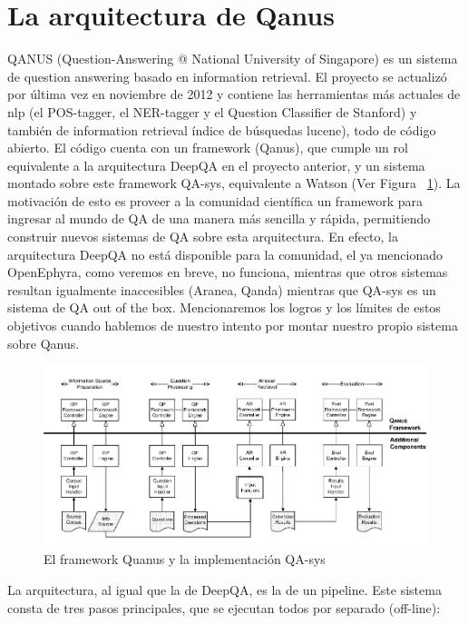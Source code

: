\bigskip

\section{La arquitectura de Qanus}

QANUS (Question-Answering @ National University of Singapore) es un
sistema de question answering basado en information retrieval. El
proyecto se actualizó por última vez en noviembre de 2012 y
contiene las herramientas más actuales de nlp (el POS-tagger, el
NER-tagger y el Question Classifier de Stanford) y también de
information retrieval índice de búsquedas lucene), todo de código
abierto. El código cuenta con un framework (Qanus), que cumple un rol
equivalente a la arquitectura DeepQA en el proyecto anterior, y un
sistema montado sobre este framework QA-sys, equivalente a Watson (Ver Figura ~\ref{fig:Quanus}). La
motivación de esto es proveer a la comunidad científica un
framework para ingresar al mundo de QA de una manera más sencilla y
rápida, permitiendo construir nuevos sistemas de QA sobre esta
arquitectura. En efecto, la arquitectura DeepQA no está disponible
para la comunidad, el ya mencionado OpenEphyra, como veremos en breve,
no funciona, mientras que otros sistemas resultan igualmente
inaccesibles (Aranea, Qanda) mientras que QA-sys es un sistema de QA
out of the box. Mencionaremos los logros y los límites de estos
objetivos cuando hablemos de nuestro intento por montar nuestro propio
sistema sobre Qanus. 

\begin{figure}
  \centering
    \includegraphics{graficos/Quanus}
  \caption{El framework Quanus y la implementación QA-sys}
  \label{fig:Quanus}
\end{figure}


La arquitectura, al igual que la de DeepQA, es la de un pipeline. Este
sistema consta de tres pasos principales, que se ejecutan todos por
separado (off-line): 


